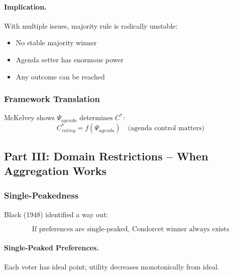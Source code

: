 \paragraph{Implication.}
With multiple issues, majority rule is radically unstable:
\begin{itemize}
    \item No stable majority winner
    \item Agenda setter has enormous power
    \item Any outcome can be reached
\end{itemize}

\subsubsection{Framework Translation}

McKelvey shows $\Psi_{agenda}$ determines $C^*$:
\begin{equation}
C^*_{voting} = f(\Psi_{agenda}) \quad \text{(agenda control matters)}
\end{equation}

\subsection{Part III: Domain Restrictions – When Aggregation Works}

\subsubsection{Single-Peakedness}

Black (1948) identified a way out:

\begin{equation}
\boxed{
\text{If preferences are single-peaked, Condorcet winner always exists}
}
\label{eq:singlepeaked}
\end{equation}

\paragraph{Single-Peaked Preferences.}
Each voter has ideal point; utility decreases monotonically from ideal.

\begin{center}
\end{center}

